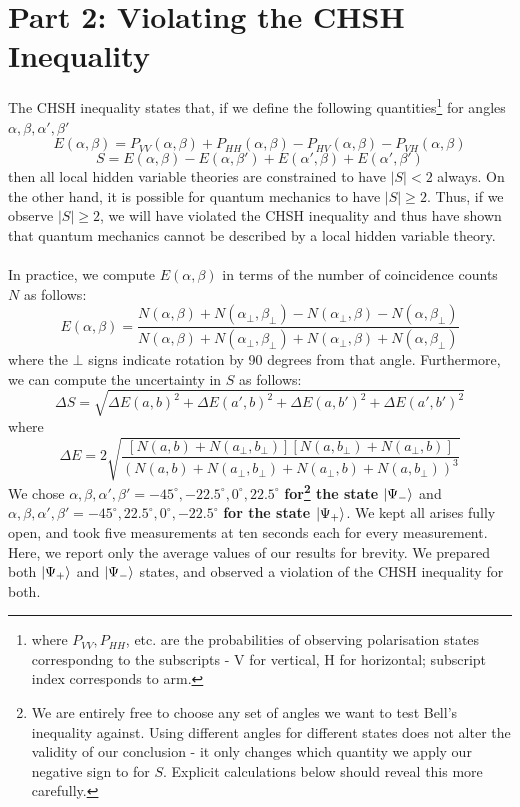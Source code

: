\documentclass[10pt,a4paper]{article}
\begin{document}
\section*{Part 2: Violating the CHSH Inequality}
The CHSH inequality states that, if we define the following quantities\footnote{where $P_{VV}, P_{HH}$, etc. are the probabilities of observing polarisation states correspondng to the subscripts - V for vertical, H for horizontal; subscript index corresponds to arm.} for angles $\alpha,\beta,\alpha',\beta'$
$$ E(\alpha,\beta) = P_{VV}(\alpha,\beta) + P_{HH}(\alpha,\beta) - P_{HV}(\alpha,\beta) - P_{VH}(\alpha,\beta)$$
$$ S = E(\alpha,\beta) - E(\alpha,\beta') + E(\alpha',\beta) + E(\alpha',\beta')$$
then all local hidden variable theories are constrained to have $\lvert S \rvert < 2$ always. On the other hand, it is possible for quantum mechanics to have $\lvert S \rvert \geq 2$. Thus, if we observe $\lvert S \rvert \geq 2$, we will have violated the CHSH inequality and thus have shown that quantum mechanics cannot be described by a local hidden variable theory.\\
\\
In practice, we compute $E(\alpha,\beta)$ in terms of the number of coincidence counts $N$ as follows:
$$E(\alpha,\beta) = \dfrac{N(\alpha,\beta) + N(\alpha_{\bot},\beta_{\bot}) - N(\alpha_{\bot},\beta) - N(\alpha,\beta_{\bot})}{N(\alpha,\beta) + N(\alpha_{\bot},\beta_{\bot}) + N(\alpha_{\bot},\beta) + N(\alpha,\beta_{\bot})} $$ 
where the $\bot$ signs indicate rotation by 90 degrees from that angle. Furthermore, we can compute the uncertainty in $S$ as follows:
$$ \Delta S = \sqrt{\Delta E(a,b)^{2} + \Delta E(a',b)^{2} + \Delta E(a,b')^{2} + \Delta E(a',b')^{2}} $$
where 
$$ \Delta E = 2 \sqrt{\dfrac{\left[N(a,b) + N(a_{\bot},b_{\bot})\right]\left[N(a,b_{\bot}) + N(a_{\bot},b)\right]}{\left(N(a,b) + N(a_{\bot},b_{\bot}) + N(a_{\bot},b) + N(a,b_{\bot})\right)^{3}}}$$
We chose $\alpha,\beta,\alpha',\beta' = -45^{\circ},-22.5^{\circ},0^{\circ},22.5^{\circ}$ \textbf{for\footnote{We are entirely free to choose any set of angles we want to test Bell's inequality against. Using different angles for different states does not alter the validity of our conclusion - it only changes which quantity we apply our negative sign to for $S$. Explicit calculations below should reveal this more carefully.} the state $\ket{\Psi_{-}}$} and $\alpha,\beta,\alpha',\beta' = -45^{\circ},22.5^{\circ},0^{\circ},-22.5^{\circ}$ \textbf{for the state $\ket{\Psi_{+}}$}. We kept all arises fully open, and took five measurements at ten seconds each for every measurement. Here, we report only the average values of our results for brevity. We prepared both $\ket{\Psi_{+}}$ and $\ket{\Psi_{-}}$ states, and observed a violation of the CHSH inequality for both.
\end{document}
